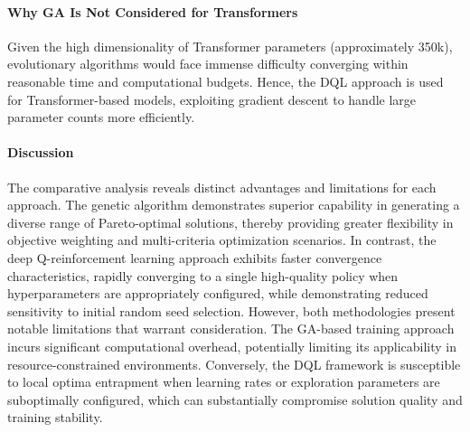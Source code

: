 \documentclass[preprint,3p,authoryear]{elsarticle}
\begin{document}
\paragraph{Why GA Is Not Considered for Transformers}
Given the high dimensionality of Transformer parameters (approximately 350k), evolutionary algorithms would face immense difficulty converging within reasonable time and computational budgets. Hence, the DQL approach is used for Transformer-based models, exploiting gradient descent to handle large parameter counts more efficiently.

\paragraph{Discussion}
The comparative analysis reveals distinct advantages and limitations for each approach. The genetic algorithm demonstrates superior capability in generating a diverse range of Pareto-optimal solutions, thereby providing greater flexibility in objective weighting and multi-criteria optimization scenarios. In contrast, the deep Q-reinforcement learning approach exhibits faster convergence characteristics, rapidly converging to a single high-quality policy when hyperparameters are appropriately configured, while demonstrating reduced sensitivity to initial random seed selection. However, both methodologies present notable limitations that warrant consideration. The GA-based training approach incurs significant computational overhead, potentially limiting its applicability in resource-constrained environments. Conversely, the DQL framework is susceptible to local optima entrapment when learning rates or exploration parameters are suboptimally configured, which can substantially compromise solution quality and training stability.


\end{document}
